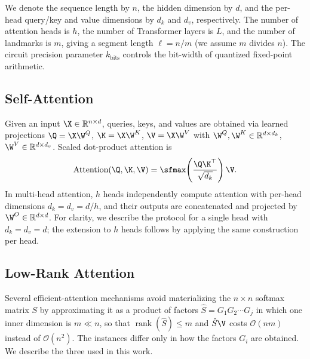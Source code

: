 \documentclass[runningheads]{llncs}
\begin{document}
We denote the sequence length by $n$, the hidden dimension by $d$, and the per-head query/key and value dimensions by $d_k$ and $d_v$, respectively. The number of attention heads is $h$, the number of Transformer layers is $L$, and the number of landmarks is $m$, giving a segment length $\ell = n/m$ (we assume $m$ divides $n$). The circuit precision parameter $k_{\text{bits}}$ controls the bit-width of quantized fixed-point arithmetic.

\subsection{Self-Attention}
Given an input $\X \in \mathbb{R}^{n \times d}$, queries, keys, and values are obtained via learned projections $\Q = \X \W^Q$, $\K = \X \W^K$, $\V = \X \W^V$ with $\W^Q, \W^K \in \mathbb{R}^{d \times d_k}$, $\W^V \in \mathbb{R}^{d \times d_v}$. Scaled dot-product attention is
\[
    \text{Attention} (\Q, \K, \V ) = \sfmax\!\left(\frac{\Q\K^\top}{\sqrt{d_k}}\right)\V.
\]
In multi-head attention, $h$ heads independently compute attention with per-head dimensions $d_k = d_v = d/h$, and their outputs are concatenated and projected by $\W^O \in \mathbb{R}^{d \times d}$. For clarity, we describe the protocol for a single head with $d_k = d_v = d$; the extension to $h$ heads follows by applying the same construction per head.

\subsection{Low-Rank Attention}\label{subsec:lowrank}
Several efficient-attention mechanisms avoid materializing the $n \times n$ softmax matrix $S$ by approximating it as a product of factors $\hat S = G_1 G_2 \cdots G_j$ in which one inner dimension is $m \ll n$, so that $\operatorname{rank}(\hat S) \le m$ and $\hat S \V$ costs $\mathcal{O}(nm)$ instead of $\mathcal{O}(n^2)$. The instances differ only in how the factors $G_i$ are obtained. We describe the three used in this work.
\end{document}
